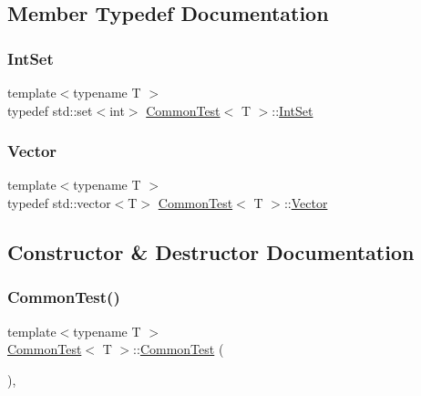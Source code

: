 \subsection{Member Typedef Documentation}
\mbox{\label{class_common_test_a62827e9d3064cddf4a8698747f1bd434}} 
\subsubsection{\texorpdfstring{Int\+Set}{IntSet}}
{\footnotesize\ttfamily template$<$typename T $>$ \\
typedef std\+::set$<$int$>$ \hyperlink{class_common_test}{Common\+Test}$<$ T $>$\+::\hyperlink{class_common_test_a62827e9d3064cddf4a8698747f1bd434}{Int\+Set}\hspace{0.3cm}{\ttfamily [protected]}}

\mbox{\label{class_common_test_a6dfdcede6964887b9f4254a0e0478e37}} 
\subsubsection{\texorpdfstring{Vector}{Vector}}
{\footnotesize\ttfamily template$<$typename T $>$ \\
typedef std\+::vector$<$T$>$ \hyperlink{class_common_test}{Common\+Test}$<$ T $>$\+::\hyperlink{class_common_test_a6dfdcede6964887b9f4254a0e0478e37}{Vector}\hspace{0.3cm}{\ttfamily [protected]}}



\subsection{Constructor \& Destructor Documentation}
\mbox{\label{class_common_test_abd5ec205d90f4b81efab2a6f972f3db0}} 
\subsubsection{\texorpdfstring{Common\+Test()}{CommonTest()}}
{\footnotesize\ttfamily template$<$typename T $>$ \\
\hyperlink{class_common_test}{Common\+Test}$<$ T $>$\+::\hyperlink{class_common_test}{Common\+Test} (\begin{DoxyParamCaption}{ }\end{DoxyParamCaption})\hspace{0.3cm}{\ttfamily [inline]}, {\ttfamily [protected]}}

